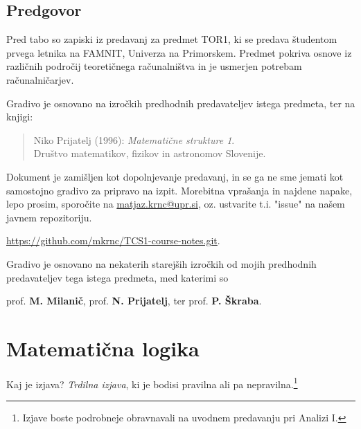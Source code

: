 \documentclass[11pt,paper=b5,footinclude,headinclude]{scrbook} %
\begin{document}



\newpage
\section*{Predgovor}
Pred tabo so zapiski iz predavanj za predmet TOR1, ki se predava študentom prvega letnika na FAMNIT, Univerza na Primorskem.
Predmet pokriva osnove iz različnih področij teoretičnega računalništva in je usmerjen potrebam računalničarjev.

Gradivo je osnovano na izročkih  predhodnih predavateljev istega predmeta, ter na knjigi: 
\begin{quote}
   Niko Prijatelj (1996):
   \emph{Matematične strukture 1}.
   \\
   Društvo   matematikov,   fizikov in astronomov Slovenije. 
\end{quote}

Dokument je zamišljen kot dopolnjevanje predavanj, in se ga ne sme jemati kot samostojno gradivo za pripravo na izpit. 
Morebitna vprašanja in najdene napake, lepo prosim, sporočite na
\url{matjaz.krnc@upr.si}, oz. ustvarite t.i. "issue"\xspace na našem javnem repozitoriju.
\begin{center}
    \url{https://github.com/mkrnc/TCS1-course-notes.git}.    
\end{center}

\medskip
Gradivo je osnovano na nekaterih starejših izročkih od mojih predhodnih predavateljev tega istega predmeta, med katerimi so 
\begin{center}
    prof. \textbf{M. Milanič}, 
    prof. \textbf{N. Prijatelj}, ter 
    prof. \textbf{P. Škraba}.
\end{center}




\tableofcontents


\chapter{Matematična logika}

Kaj je izjava? {\em Trdilna izjava}, ki je bodisi pravilna ali pa nepravilna.\footnote{Izjave boste podrobneje obravnavali na uvodnem predavanju pri Analizi I.}
\end{document}
